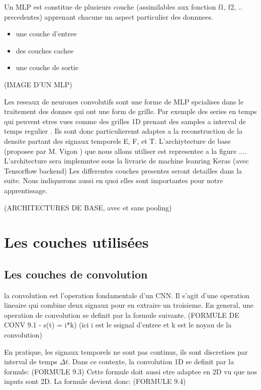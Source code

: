 Un MLP est constitue de plusieurs couche (assimilables aux fonction f1, f2, .. precedentes) apprenant chacune un aspect particulier des donnnees.
\begin{itemize}
 \item une couche d'entree
 \item des couches cachee
 \item une couche de sortie
\end{itemize}


(IMAGE D'UN MLP)

Les reseaux de neurones convolutifs sont une forme de MLP spcialises dans le traitement des donnes qui ont une form de grille. Par exemple des series en temps qui peuvent etres vues comme des grilles 1D prenant des samples a interval de temps regulier \parencite{Reference5}. Ils sont donc particulieremt adaptes a la reconstruction de la densite partant des signaux temporels E, F, et T. L'archiytecture de base (proposee par M. Vigon ) que nous allons utiliser est representee a la figure .... L'architecture sera implemntee sous la livrarie de machine leanring Keras (avec Tensorflow backend) Les differentes couches presentes seront detailles dans la suite. Nous indiquerons aussi en quoi elles sont importantes pour notre apprentissage.

(ARCHITECTURES DE BASE, avec et sans pooling)


\section{Les couches utilisées}

\subsection{Les couches de convolution}
la convolution est l'operation fondamentale d'un CNN. Il s'agit d'une operation lineaire qui combine deux signaux pour en extraire un troisieme. En general, une operation de convolution se definit par la formule suivante.
(FORMULE DE CONV 9.1 - s(t) = i*k) (ici i est le ssignal d'entree et k est le noyau de la convolution)

En pratique, les signaux temporels ne sont pas continus, ils sont discretises par interval de temps $\Delta t$. Dans ce contexte, la convolution 1D se definit par la formule:
(FORMULE 9.3)
Cette formule doit aussi etre adaptee en 2D vu que nos inputs sont 2D. La formule devient donc:
(FORMULE 9.4)


